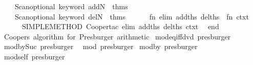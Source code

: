 \begin{isabellebody}
\ \ \ \ Scan{\isachardot}{\kern0pt}optional\ {\isacharparenleft}{\kern0pt}keyword\ addN\ {\isacharbar}{\kern0pt}{\isacharminus}{\kern0pt}{\isacharminus}{\kern0pt}\ thms{\isacharparenright}{\kern0pt}\ {\isacharbrackleft}{\kern0pt}{\isacharbrackright}{\kern0pt}\ {\isacharminus}{\kern0pt}{\isacharminus}{\kern0pt}\isanewline
\ \ \ \ Scan{\isachardot}{\kern0pt}optional\ {\isacharparenleft}{\kern0pt}keyword\ delN\ {\isacharbar}{\kern0pt}{\isacharminus}{\kern0pt}{\isacharminus}{\kern0pt}\ thms{\isacharparenright}{\kern0pt}\ {\isacharbrackleft}{\kern0pt}{\isacharbrackright}{\kern0pt}\ {\isachargreater}{\kern0pt}{\isachargreater}{\kern0pt}\isanewline
\ \ \ \ {\isacharparenleft}{\kern0pt}fn\ {\isacharparenleft}{\kern0pt}{\isacharparenleft}{\kern0pt}elim{\isacharcomma}{\kern0pt}\ add{\isacharunderscore}{\kern0pt}ths{\isacharparenright}{\kern0pt}{\isacharcomma}{\kern0pt}\ del{\isacharunderscore}{\kern0pt}ths{\isacharparenright}{\kern0pt}\ {\isacharequal}{\kern0pt}{\isachargreater}{\kern0pt}\ fn\ ctxt\ {\isacharequal}{\kern0pt}{\isachargreater}{\kern0pt}\isanewline
\ \ \ \ \ \ SIMPLE{\isacharunderscore}{\kern0pt}METHOD{\isacharprime}{\kern0pt}\ {\isacharparenleft}{\kern0pt}Cooper{\isachardot}{\kern0pt}tac\ elim\ add{\isacharunderscore}{\kern0pt}ths\ del{\isacharunderscore}{\kern0pt}ths\ ctxt{\isacharparenright}{\kern0pt}{\isacharparenright}{\kern0pt}\isanewline
\ \ end\isanewline
{\isacartoucheclose}\ {\isachardoublequoteopen}Cooper{\isacharprime}{\kern0pt}s\ algorithm\ for\ Presburger\ arithmetic{\isachardoublequoteclose}%
\endisatagML
{\isafoldML}%
%
\isadelimML
\isanewline
%
\endisadelimML
\isanewline
{}\isamarkupfalse%
\ mod{\isacharunderscore}{\kern0pt}eq{\isacharunderscore}{\kern0pt}{}{\isacharunderscore}{\kern0pt}iff{\isacharunderscore}{\kern0pt}dvd\ {\isacharbrackleft}{\kern0pt}presburger{\isacharbrackright}{\kern0pt}\isanewline
{}\isamarkupfalse%
\ mod{\isacharunderscore}{\kern0pt}by{\isacharunderscore}{\kern0pt}Suc{\isacharunderscore}{\kern0pt}{}\ {\isacharbrackleft}{\kern0pt}presburger{\isacharbrackright}{\kern0pt}\ \isanewline
{}\isamarkupfalse%
\ mod{\isacharunderscore}{\kern0pt}{}\ {\isacharbrackleft}{\kern0pt}presburger{\isacharbrackright}{\kern0pt}\isanewline
{}\isamarkupfalse%
\ mod{\isacharunderscore}{\kern0pt}by{\isacharunderscore}{\kern0pt}{}\ {\isacharbrackleft}{\kern0pt}presburger{\isacharbrackright}{\kern0pt}\isanewline
{}\isamarkupfalse%
\ mod{\isacharunderscore}{\kern0pt}self\ {\isacharbrackleft}{\kern0pt}presburger{\isacharbrackright}{\kern0pt}\isanewline

\end{isabellebody}
